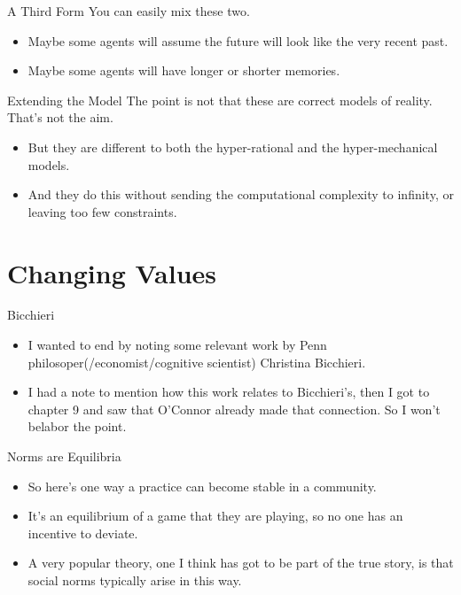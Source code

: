 \documentclass[
  ignorenonframetext,
]{beamer}
\providecommand{\tightlist}{%
  \setlength{\itemsep}{0pt}\setlength{\parskip}{0pt}}
\begin{document}
\begin{frame}{A Third Form}
\protect\hypertarget{a-third-form}{}
You can easily mix these two.

\begin{itemize}
\tightlist
\item
  Maybe some agents will assume the future will look like the very
  recent past.
\item
  Maybe some agents will have longer or shorter memories.
\end{itemize}
\end{frame}

\begin{frame}{Extending the Model}
\protect\hypertarget{extending-the-model}{}
The point is not that these are correct models of reality. That's not
the aim.

\begin{itemize}
\tightlist
\item
  But they are different to both the hyper-rational and the
  hyper-mechanical models.
\item
  And they do this without sending the computational complexity to
  infinity, or leaving too few constraints.
\end{itemize}
\end{frame}

\hypertarget{changing-values}{%
\section{Changing Values}\label{changing-values}}

\begin{frame}{Bicchieri}
\protect\hypertarget{bicchieri}{}
\begin{itemize}
\tightlist
\item
  I wanted to end by noting some relevant work by Penn
  philosoper(/economist/cognitive scientist) Christina Bicchieri.
\item
  I had a note to mention how this work relates to Bicchieri's, then I
  got to chapter 9 and saw that O'Connor already made that connection.
  So I won't belabor the point.
\end{itemize}
\end{frame}

\begin{frame}{Norms are Equilibria}
\protect\hypertarget{norms-are-equilibria}{}
\begin{itemize}
\tightlist
\item
  So here's one way a practice can become stable in a community.
\item
  It's an equilibrium of a game that they are playing, so no one has an
  incentive to deviate.
\item
  A very popular theory, one I think has got to be part of the true
  story, is that social norms typically arise in this way.
\end{itemize}
\end{frame}
\end{document}

